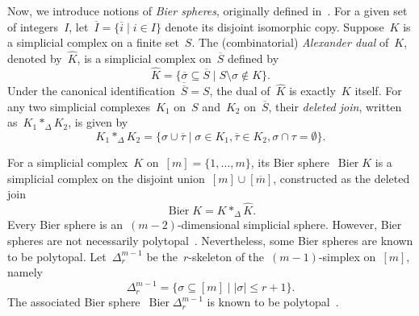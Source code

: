 \documentclass[11pt]{amsart}
\theoremstyle{plain}
\numberwithin{equation}{section}
\theoremstyle{definition}
\DeclareMathOperator{\Bier}{Bier}
\begin{document}
Now, we introduce notions of \emph{Bier spheres}, originally defined in~\cite{Bier1992}.
For a given set of integers~$I$, let~$\overline{I} = \{\overline{i} \mid i \in I\}$ denote its disjoint isomorphic copy. 
Suppose~$K$ is a simplicial complex on a finite set~$S$. 
The (combinatorial) \emph{Alexander dual} of~$K$, denoted by~$\widehat{K}$, is a simplicial complex on~$\overline{S}$ defined by
$$
    \widehat{K} = \{\overline{\sigma} \subseteq \overline{S} \mid S \setminus \sigma \notin K\}.
$$
Under the canonical identification~$\overline{\overline{S}} = S$, the dual of~$\widehat{K}$ is exactly~$K$ itself.
For any two simplicial complexes~$K_1$ on~$S$ and~$K_2$ on~$\overline{S}$, their \emph{deleted join}, written as~$K_1 \ast_{\Delta} K_2$, is given by
$$
    K_1 \ast_{\Delta} K_2 = \{\sigma \cup \overline{\tau} \mid \sigma \in K_1, \overline{\tau} \in K_2, \sigma \cap \tau = \emptyset\}.
$$

For a simplicial complex~$K$ on~$[m] = \{1,\ldots,m\}$, its Bier sphere~$\Bier K$ is a simplicial complex on the disjoint union~$[m] \cup [\overline{m}]$, constructed as the deleted join
$$
    \Bier K = K \ast_{\Delta} \widehat{K}.
$$
Every Bier sphere is an~$(m-2)$-dimensional simplicial sphere.
However, Bier spheres are not necessarily polytopal~\cite{Bjorner-Paffenholz-Sjostrand-Ziegler2005}.
Nevertheless, some Bier spheres are known to be polytopal.
Let~$\Delta_{r}^{m-1}$ be the~$r$-skeleton of the~$(m-1)$-simplex on~$[m]$, namely
$$
    \Delta_{r}^{m-1}=\{\sigma \subseteq [m] \mid |\sigma| \leq r+1\}.
$$
The associated Bier sphere~$\Bier\Delta_{r}^{m-1}$ is known to be polytopal~\cite{Jevtic-Timotijevic-Zivaljevic2021}.
\end{document}
